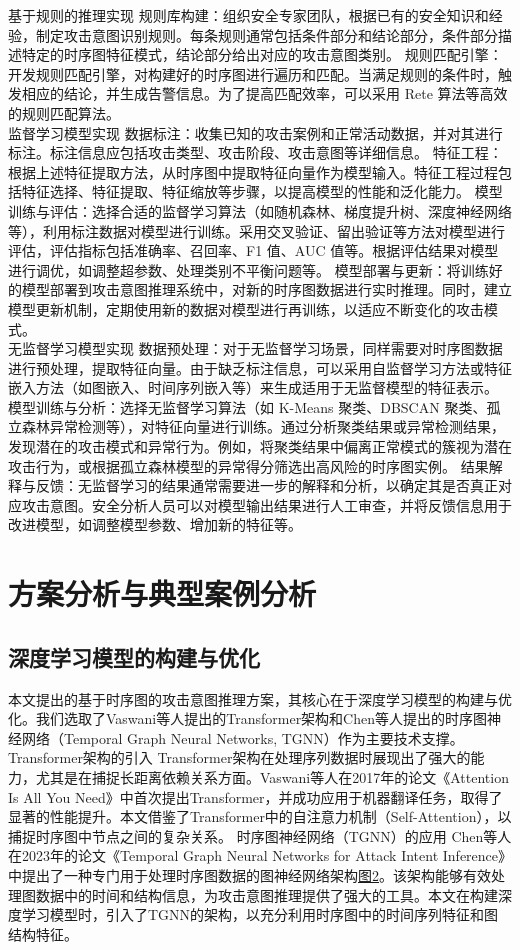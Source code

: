 \documentclass{article} %
\begin{document}
	基于规则的推理实现
	规则库构建：组织安全专家团队，根据已有的安全知识和经验，制定攻击意图识别规则。每条规则通常包括条件部分和结论部分，条件部分描述特定的时序图特征模式，结论部分给出对应的攻击意图类别。
	规则匹配引擎：开发规则匹配引擎，对构建好的时序图进行遍历和匹配。当满足规则的条件时，触发相应的结论，并生成告警信息。为了提高匹配效率，可以采用 Rete 算法等高效的规则匹配算法。\\
	监督学习模型实现
	数据标注：收集已知的攻击案例和正常活动数据，并对其进行标注。标注信息应包括攻击类型、攻击阶段、攻击意图等详细信息。
	特征工程：根据上述特征提取方法\citep{Esteban2017}，从时序图中提取特征向量作为模型输入。特征工程过程包括特征选择、特征提取、特征缩放等步骤，以提高模型的性能和泛化能力。
	模型训练与评估：选择合适的监督学习算法（如随机森林、梯度提升树、深度神经网络等），利用标注数据对模型进行训练。采用交叉验证、留出验证等方法对模型进行评估，评估指标包括准确率、召回率、F1 值、AUC 值等。根据评估结果对模型进行调优，如调整超参数、处理类别不平衡问题等。
	模型部署与更新：将训练好的模型部署到攻击意图推理系统中，对新的时序图数据进行实时推理。同时，建立模型更新机制，定期使用新的数据对模型进行再训练，以适应不断变化的攻击模式。\\
	无监督学习模型实现
	数据预处理：对于无监督学习场景，同样需要对时序图数据进行预处理，提取特征向量。由于缺乏标注信息，可以采用自监督学习方法或特征嵌入方法（如图嵌入、时间序列嵌入等）来生成适用于无监督模型的特征表示。
	模型训练与分析：选择无监督学习算法（如 K-Means 聚类、DBSCAN 聚类、孤立森林异常检测等），对特征向量进行训练。通过分析聚类结果或异常检测结果，发现潜在的攻击模式和异常行为。例如，将聚类结果中偏离正常模式的簇视为潜在攻击行为，或根据孤立森林模型的异常得分筛选出高风险的时序图实例。
	结果解释与反馈：无监督学习的结果通常需要进一步的解释和分析，以确定其是否真正对应攻击意图。安全分析人员可以对模型输出结果进行人工审查，并将反馈信息用于改进模型，如调整模型参数、增加新的特征等。
	
	\section{方案分析与典型案例分析}
	
	\subsection{深度学习模型的构建与优化}
	本文提出的基于时序图的攻击意图推理方案，其核心在于深度学习模型的构建与优化。我们选取了Vaswani等人提出的Transformer架构和Chen等人提出的时序图神经网络（Temporal Graph Neural Networks, TGNN）作为主要技术支撑。
	Transformer架构的引入
	Transformer架构在处理序列数据时展现出了强大的能力，尤其是在捕捉长距离依赖关系方面。Vaswani等人在2017年的论文《Attention Is All You Need》中首次提出Transformer，并成功应用于机器翻译任务，取得了显著的性能提升。本文借鉴了Transformer中的自注意力机制（Self-Attention），以捕捉时序图中节点之间的复杂关系。
	时序图神经网络（TGNN）的应用
	Chen等人在2023年的论文《Temporal Graph Neural Networks for Attack Intent Inference》中提出了一种专门用于处理时序图数据的图神经网络架构\hyperref[tgnn]{图2}。该架构能够有效处理图数据中的时间和结构信息，为攻击意图推理提供了强大的工具。本文在构建深度学习模型时，引入了TGNN的架构，以充分利用时序图中的时间序列特征和图结构特征。
	
\end{document}
